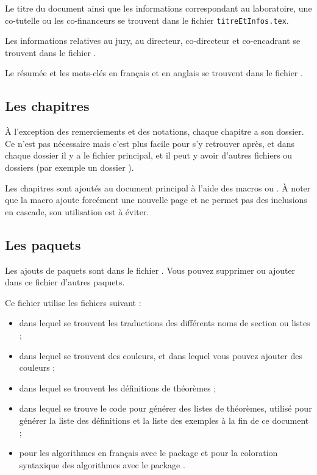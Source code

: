   Le titre du document ainsi que les informations correspondant au laboratoire, une co-tutelle ou les co-financeurs se trouvent dans le fichier \texttt{titreEtInfos.tex}.
  
  Les informations relatives au jury, au directeur, co-directeur et co-encadrant se trouvent dans le fichier .
  
  Le résumée et les mots-clés en français et en anglais se trouvent dans le fichier .
  
  \subsection{Les chapitres}
  À l'exception des remerciements et des notations, chaque chapitre a son dossier. 
  Ce n'est pas nécessaire mais c'est plus facile pour s'y retrouver après, et dans chaque dossier il y a le fichier principal, et il peut y avoir d'autres fichiers ou dossiers (par exemple un dossier ).
  
  Les chapitres sont ajoutés au document principal à l'aide des macros \verb|| ou \verb||. À noter que la macro \verb|| ajoute forcément une nouvelle page et ne permet pas des inclusions en cascade, son utilisation est à éviter.
  
  \subsection{Les paquets}
  Les ajouts de paquets sont dans le fichier . Vous pouvez supprimer ou ajouter dans ce fichier d'autres paquets. 
  
  Ce fichier utilise les fichiers suivant :
  \begin{itemize}
    \item {} dans lequel se trouvent les traductions des différents noms de section ou listes ;
    \item {} dans lequel se trouvent des couleurs, et dans lequel vous pouvez ajouter des couleurs ;
    \item {} dans lequel se trouvent les définitions de théorèmes ;
    \item {} dans lequel se trouve le code pour générer des listes de théorèmes, utilisé pour générer la liste des définitions et la liste des exemples à la fin de ce document ;
    \item {} pour les algorithmes en français avec le package  et  pour la coloration syntaxique des algorithmes avec le package .
  \end{itemize}

